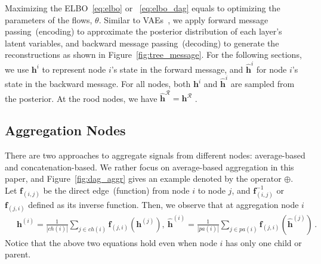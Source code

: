 \documentclass[sigconf, anonymous, review]{acmart}
\theoremstyle{plain}
\theoremstyle{definition}
\theoremstyle{remark}
\begin{document}
Maximizing the ELBO~\eqref{eq:elbo} or ~\eqref{eq:elbo_dag} equals to  optimizing the parameters of the flows, $\theta$.  Similar to VAEs~\cite{kingma2013auto,rezende2014stochastic}, we apply forward message passing~(encoding) to approximate the posterior  distribution of each layer's latent variables, and backward message passing~(decoding) to  generate the reconstructions as shown in Figure~\ref{fig:tree_message}. 
For the following sections, we use $\mathbf{h}^{i}$ to represent  node $i$'s state in the forward message, and $\widehat{\mathbf{h}}^{i}$ for  node $i$'s state in the backward message. For all nodes, both $\mathbf{h}^{i}$ and $\widehat{\mathbf{h}}^{i}$  are sampled from the posterior. At the rood nodes, we have  $\widehat{\mathbf{h}}^{\mathcal{R}}=\mathbf{h}^{\mathcal{R}}$ . 


\subsection{ Aggregation Nodes}\label{sec:node_aggr}


 There are two approaches to aggregate signals from different nodes: average-based and concatenation-based. We rather focus on average-based aggregation in this paper,  and Figure~\ref{fig:dag_aggr} gives  an example denoted by the operator $\oplus$. 
Let $\mathbf{f}_{(i, j)}$ be the direct edge~(function) from node $i$ to node $j$, and $\mathbf{f}^{-1}_{ (i, j)}$ or  $\mathbf{f}_{ (j, i)}$ defined as its inverse function. Then, we observe that at aggregation node $i$
 \begin{align}~\label{eq:aggr_node}
&  \mathbf{h}^{(i)} = \frac{1}{|ch(i)|} \sum_{j \in ch(i) } \mathbf{f}_{(j,i)}(\mathbf{h}^{(j)}) , \  \widehat{\mathbf{h}}^{(i)} = \frac{1}{|pa(i)|} \sum_{j \in pa(i) } \mathbf{f}_{ (j,i)}(\widehat{\mathbf{h}}^{(j)}) \, .
\end{align}
Notice that the above two equations hold even when node $i$ has only one child or parent. 
\end{document}
